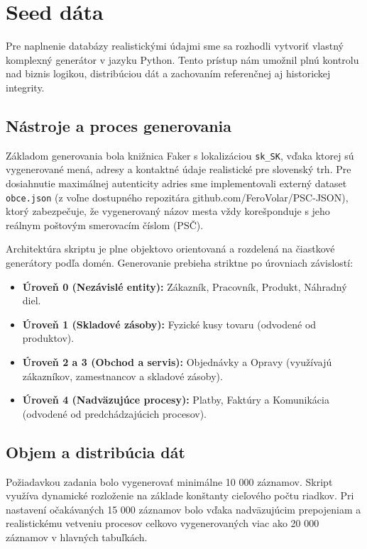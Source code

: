 \documentclass[11pt, a4paper]{article}
\begin{document}
\newpage
\section{Seed dáta}
\label{sec:seed}

Pre naplnenie databázy realistickými údajmi sme sa rozhodli vytvoriť vlastný komplexný generátor v jazyku Python. Tento prístup nám umožnil plnú kontrolu nad biznis logikou, distribúciou dát a zachovaním referenčnej aj historickej integrity.

\subsection{Nástroje a proces generovania}
Základom generovania bola knižnica Faker s lokalizáciou \texttt{sk\_SK}, vďaka ktorej sú vygenerované mená, adresy a kontaktné údaje realistické pre slovenský trh. Pre dosiahnutie maximálnej autenticity adries sme implementovali externý dataset \texttt{obce.json} (z voľne dostupného repozitára github.com/FeroVolar/PSC-JSON), ktorý zabezpečuje, že vygenerovaný názov mesta vždy korešponduje s jeho reálnym poštovým smerovacím číslom (PSČ).

Architektúra skriptu je plne objektovo orientovaná a rozdelená na čiastkové generátory podľa domén. Generovanie prebieha striktne po úrovniach závislostí:
\begin{itemize}
    \item \textbf{Úroveň 0 (Nezávislé entity):} Zákazník, Pracovník, Produkt, Náhradný diel.
    \item \textbf{Úroveň 1 (Skladové zásoby):} Fyzické kusy tovaru (odvodené od produktov).
    \item \textbf{Úroveň 2 a 3 (Obchod a servis):} Objednávky a Opravy (využívajú zákazníkov, zamestnancov a skladové zásoby).
    \item \textbf{Úroveň 4 (Nadväzujúce procesy):} Platby, Faktúry a Komunikácia (odvodené od predchádzajúcich procesov).
\end{itemize}

\subsection{Objem a distribúcia dát}
Požiadavkou zadania bolo vygenerovať minimálne 10 000 záznamov. Skript využíva dynamické rozloženie na základe konštanty cieľového počtu riadkov. Pri nastavení očakávaných 15 000 záznamov bolo vďaka nadväzujúcim prepojeniam a realistickému vetveniu procesov celkovo vygenerovaných viac ako 20 000 záznamov v hlavných tabuľkách.
\end{document}
